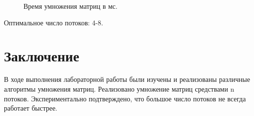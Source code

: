 \documentclass[a4paper,12pt]{article}
\begin{document}
\begin{figure}[H]
	\noindent{}
	\caption{Время умножения матриц в мс.}
\end{figure}

Оптимальное число потоков: 4-8.

\section{Заключение}
	В ходе выполнения лабораторной работы были изучены и реализованы различные алгоритмы умножения матриц. Реализовано умножение матриц средствами n потоков. Экспериментально подтверждено, что большое число потоков не всегда работает быстрее.
\end{document}
